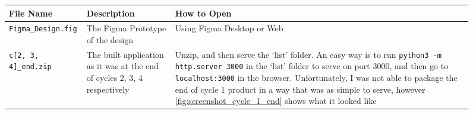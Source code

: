 
\begin{figure}[h]
    \centering
    \begin{tabular}{|m{4cm}|p{5cm}|>{\raggedright\arraybackslash}p{5.5cm}|}
        \hline \textbf{File Name} & \textbf{Description} & \textbf{How to Open} \\ \hline
        \verb|Figma_Design.fig| & The Figma Prototype of the design & Using Figma Desktop or Web\\ \hline
        \verb|c[2, 3, 4]_end.zip| & The built application as it was at the end of cycles 2, 3, 4 respectively & Unzip, and then serve the `list' folder. \newline An easy way is to run \verb|python3 -m http.server 3000| in the `list' folder to serve on port 3000, and then go to \verb|localhost:3000| in the browser. Unfortunately, I was not able to package the end of cycle 1 product in a way that was as simple to serve, however \ref{fig:screenshot_cycle_1_end} shows what it looked like\\ \hline
    \end{tabular}
\end{figure}
